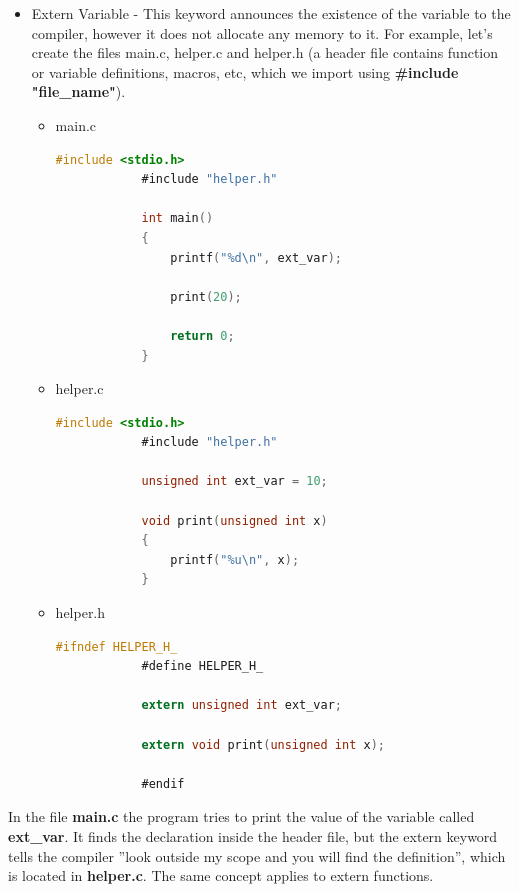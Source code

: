 \documentclass[12pt]{article}
\begin{document}
\begin{enumerate}
\begin{itemize}
        \item Extern Variable - This keyword announces the existence of the variable to the compiler, however it does not allocate any memory to it. For example, let's create the files main.c, helper.c and helper.h (a header file contains function or variable definitions, macros, etc, which we import using \textbf{\#include "file\_name"}).
        \begin{itemize}
            \item main.c
            \begin{lstlisting}[language=C]
            #include <stdio.h>
            #include "helper.h"
            
            int main() 
            {
                printf("%d\n", ext_var);
            
                print(20);
            
                return 0;
            }
            \end{lstlisting} \newpage

            \item helper.c
            \begin{lstlisting}[language=C]
            #include <stdio.h>
            #include "helper.h"
            
            unsigned int ext_var = 10;
            
            void print(unsigned int x)
            {
                printf("%u\n", x);
            }
            \end{lstlisting}

            \item helper.h
            \begin{lstlisting}[language=C]
            #ifndef HELPER_H_
            #define HELPER_H_
            
            extern unsigned int ext_var;
            
            extern void print(unsigned int x);
            
            #endif
            \end{lstlisting}
        \end{itemize}
    \end{itemize}
\end{enumerate}
In the file \textbf{main.c} the program tries to print the value of the variable called \textbf{ext\_var}. It finds the declaration inside the header file, but the extern keyword tells the compiler ”look outside my scope and you will find the definition”, which is located in \textbf{helper.c}. The same concept applies to extern functions.\newline\newline
\end{document}
